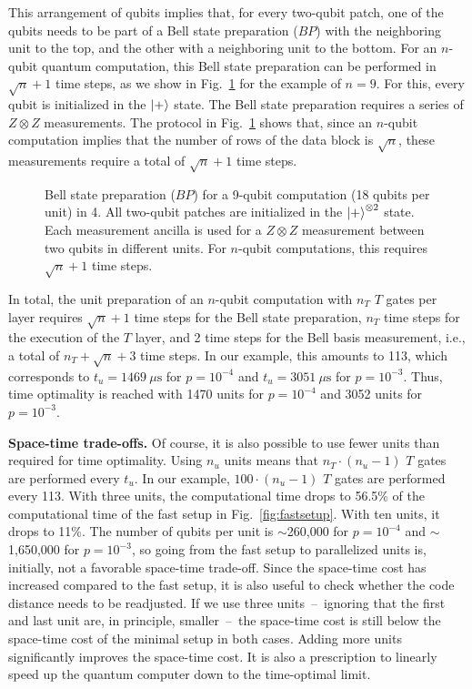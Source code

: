 \documentclass[prx,aps,letterpaper,twocolumn,allowfontchageintitle=true,accepted=2019-02-01]{quantumarticle}
\begin{document}
This arrangement of qubits implies that, for every two-qubit patch, one of the qubits needs to be part of a Bell state preparation ($BP$) with the neighboring unit to the top, and the other with a neighboring unit to the bottom. For an $n$-qubit quantum computation,  this Bell state preparation can be performed in $\sqrt{n}+1$ time steps, as we show in Fig.~\ref{fig:bellprep} for the example of $n=9$. For this, every qubit is initialized in the $\ket{+}$ state. The Bell state preparation requires a series of $Z\otimes Z$ measurements. The protocol in Fig.~\ref{fig:bellprep} shows that, since an $n$-qubit computation implies that the number of rows of the data block is $\sqrt{n}$, these measurements require a total of $\sqrt{n}+1$ time steps.

\begin{figure}[t!]
\centering
\def\svgwidth{\linewidth}

\caption{Bell state preparation ($BP$) for a 9-qubit computation (18 qubits per unit) in 4\clock. All two-qubit patches are initialized in the $\ket{+}^{\otimes 2}$ state. Each measurement ancilla is used for a $Z\otimes Z$ measurement between two qubits in different units. For $n$-qubit computations, this requires $\sqrt{n}+1$ time steps.}
\label{fig:bellprep}
\end{figure}



In total, the unit preparation of an $n$-qubit computation with $n_T$ $T$ gates per layer requires $\sqrt{n}+1$ time steps for the Bell state preparation, $n_T$ time steps for the execution of the $T$ layer, and 2 time steps for the Bell basis measurement, i.e., a total of $n_T+\sqrt{n}+3$ time steps. In our example, this amounts to 113\clock, which corresponds to $t_u = 1469~\mu\mathrm{s}$ for $p=10^{-4}$ and $t_u = 3051~\mu\mathrm{s}$ for $p=10^{-3}$. Thus, time optimality is reached with 1470 units for $p=10^{-4}$ and 3052 units for $p=10^{-3}$.

\textbf{Space-time trade-offs.} Of course, it is also possible to use fewer units than required for time optimality. Using $n_u$ units means that $n_T \cdot (n_u -1)$ $T$ gates are performed every $t_u$. In our example, $100 \cdot (n_u -1)$ $T$ gates are performed every 113\clock. With three units, the computational time drops to 56.5\% of the computational time of the fast setup in Fig.~\ref{fig:fastsetup}. With ten units, it drops to 11\%. The number of qubits per unit is ${\sim}$260,000 for $p=10^{-4}$ and ${\sim}$1,650,000 for $p=10^{-3}$, so going from the fast setup to parallelized units is, initially, not a favorable space-time trade-off. Since the space-time cost has increased compared to the fast setup, it is also useful to check whether the code distance needs to be readjusted. If we use three units~--~ignoring that the first and last unit are, in principle, smaller~--~the space-time cost is still below the space-time cost of the minimal setup in both cases. Adding more units significantly improves the space-time cost. It is also a prescription to linearly speed up the quantum computer down to the time-optimal limit.
\end{document}
